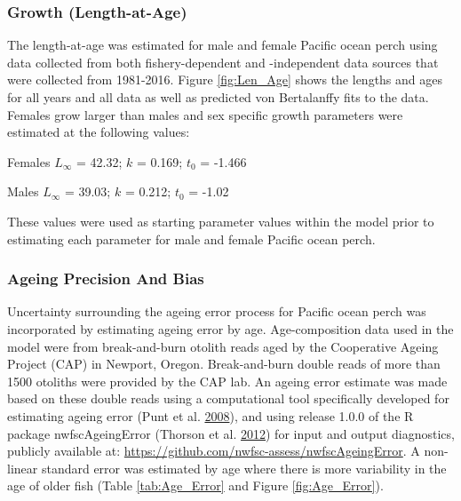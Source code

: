 \documentclass[12pt,]{article}
\begin{document}
\subsubsection{Growth (Length-at-Age)}\label{growth-length-at-age}

The length-at-age was estimated for male and female Pacific ocean perch
using data collected from both fishery-dependent and -independent data
sources that were collected from 1981-2016. Figure \ref{fig:Len_Age}
shows the lengths and ages for all years and all data as well as
predicted von Bertalanffy fits to the data. Females grow larger than
males and sex specific growth parameters were estimated at the following
values:

\begin{centering}

Females $L_{\infty}$ = 42.32; $k$ = 0.169; $t_0$ = -1.466

Males $L_{\infty}$ = 39.03; $k$ = 0.212; $t_0$ = -1.02

\end{centering}

These values were used as starting parameter values within the model
prior to estimating each parameter for male and female Pacific ocean
perch.

\subsubsection{Ageing Precision And
Bias}\label{ageing-precision-and-bias}

Uncertainty surrounding the ageing error process for Pacific ocean perch
was incorporated by estimating ageing error by age. Age-composition data
used in the model were from break-and-burn otolith reads aged by the
Cooperative Ageing Project (CAP) in Newport, Oregon. Break-and-burn
double reads of more than 1500 otoliths were provided by the CAP lab. An
ageing error estimate was made based on these double reads using a
computational tool specifically developed for estimating ageing error
(Punt et al. \protect\hyperlink{ref-punt_quantifying_2008}{2008}), and
using release 1.0.0 of the R package nwfscAgeingError (Thorson et al.
\protect\hyperlink{ref-thorson_nwfscageingerror:_2012}{2012}) for input
and output diagnostics, publicly available at:
\url{https://github.com/nwfsc-assess/nwfscAgeingError}. A non-linear
standard error was estimated by age where there is more variability in
the age of older fish (Table \ref{tab:Age_Error} and Figure
\ref{fig:Age_Error}).
\end{document}
